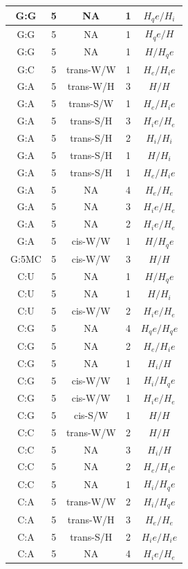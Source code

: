 \begin{center}
\begin{longtable}{c|c|c|c|c}
G:G & 5 & NA & 1 & $H_qe/H_i$ \\  \hline
G:G & 5 & NA & 1 & $H_qe/H$ \\  \hline
G:G & 5 & NA & 1 & $H/H_qe$ \\  \hline
G:C & 5 & trans-W/W & 1 & $H_e/H_ie$ \\  \hline
G:A & 5 & trans-W/H & 3 & $H/H$ \\  \hline
G:A & 5 & trans-S/W & 1 & $H_e/H_ie$ \\  \hline
G:A & 5 & trans-S/H & 3 & $H_ie/H_e$ \\  \hline
G:A & 5 & trans-S/H & 2 & $H_i/H_i$ \\  \hline
G:A & 5 & trans-S/H & 1 & $H/H_i$ \\  \hline
G:A & 5 & trans-S/H & 1 & $H_e/H_ie$ \\  \hline
G:A & 5 & NA & 4 & $H_e/H_e$ \\  \hline
G:A & 5 & NA & 3 & $H_ie/H_e$ \\  \hline
G:A & 5 & NA & 2 & $H_ie/H_e$ \\  \hline
G:A & 5 & cis-W/W & 1 & $H/H_qe$ \\  \hline
G:5MC & 5 & cis-W/W & 3 & $H/H$ \\  \hline
C:U & 5 & NA & 1 & $H/H_qe$ \\  \hline
C:U & 5 & NA & 1 & $H/H_i$ \\  \hline
C:U & 5 & cis-W/W & 2 & $H_ie/H_e$ \\  \hline
C:G & 5 & NA & 4 & $H_qe/H_qe$ \\  \hline
C:G & 5 & NA & 2 & $H_e/H_ie$ \\  \hline
C:G & 5 & NA & 1 & $H_i/H$ \\  \hline
C:G & 5 & cis-W/W & 1 & $H_i/H_qe$ \\  \hline
C:G & 5 & cis-W/W & 1 & $H_ie/H_e$ \\  \hline
C:G & 5 & cis-S/W & 1 & $H/H$ \\  \hline
C:C & 5 & trans-W/W & 2 & $H/H$ \\  \hline
C:C & 5 & NA & 3 & $H_i/H$ \\  \hline
C:C & 5 & NA & 2 & $H_e/H_ie$ \\  \hline
C:C & 5 & NA & 1 & $H_i/H_qe$ \\  \hline
C:A & 5 & trans-W/W & 2 & $H_i/H_qe$ \\  \hline
C:A & 5 & trans-W/H & 3 & $H_e/H_e$ \\  \hline
C:A & 5 & trans-S/H & 2 & $H_ie/H_ie$ \\  \hline
C:A & 5 & NA & 4 & $H_ie/H_e$ \\  \hline

\end{longtable}
\end{center}
